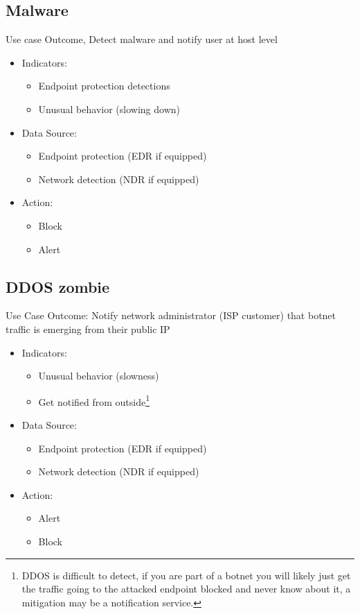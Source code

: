 \documentclass[
	letterpaper, %
	10pt, %
	unnumberedsections, %
	twoside, %
]{APAAssignment}
\begin{document}
\subsection{Malware}
Use case Outcome, Detect malware and notify user at host level
\begin{spacing}{1}
	\begin{itemize}
		\item Indicators:
		      \begin{itemize}
			      \item Endpoint protection detections
			      \item Unusual behavior (slowing down)
		      \end{itemize}
		\item Data Source:
		      \begin{itemize}
			      \item Endpoint protection (EDR if equipped)
			      \item Network detection (NDR if equipped)
		      \end{itemize}
		\item Action:
		      \begin{itemize}
			      \item Block
			      \item Alert
		      \end{itemize}
	\end{itemize}
\end{spacing}

\subsection{DDOS zombie} Use Case Outcome: Notify network administrator (ISP customer) that botnet traffic is emerging from their public IP

\begin{spacing}{1}
	\begin{itemize}
		\item Indicators:
		      \begin{itemize}
			      \item Unusual behavior (slowness)
			      \item Get notified from outside\footnote{DDOS is difficult to detect, if you are part of a botnet you will likely just get the traffic going to the attacked endpoint blocked and never know about it, a mitigation may be a notification service.}
		      \end{itemize}
		\item Data Source:
		      \begin{itemize}
			      \item Endpoint protection (EDR if equipped)
			      \item Network detection (NDR if equipped)
		      \end{itemize}
		\item Action:
		      \begin{itemize}
			      \item Alert
			      \item Block
		      \end{itemize}
	\end{itemize}
\end{spacing}
\end{document}
